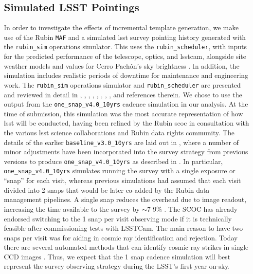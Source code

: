 \documentclass[preprintm,linenumbers]{aastex631}
\newcommand{\baselinefull}{\texttt{one\_snap\_v4.0\_10yrs}\xspace}
\newcommand{\rubinsim}{\texttt{rubin\_sim}\xspace}
\newcommand{\rubinscheduler}{\texttt{rubin\_scheduler}\xspace}
\newcommand{\maf}{\texttt{MAF}\xspace}
\begin{document}
	\subsection{Simulated LSST Pointings}
	In order to investigate the effects of incremental template generation, we make use of the Rubin \maf \citep{2014SPIE.9149E..0BJ} and a simulated \gls*{lsst} survey pointing history generated with the \rubinsim operations simulator.
 This uses the \rubinscheduler, with inputs for the predicted performance of the telescope, optics, and \gls*{lsstcam}, alongside site weather models %
 and values for Cerro Pach{\'o}n's sky brightness \citep{Yoachim2016}.
 In addition, the simulation includes realistic periods of downtime for maintenance and engineering work. 
 The \rubinsim operations simulator and \rubinscheduler are presented and reviewed in detail in \cite{2014SPIE.9150E..14C}, \cite{2014SPIE.9150E..15D}, \cite{2016SPIE.9910E..13D}, \cite{Yoachim2016},  \cite{lsstsciencecollaborationScienceDrivenOptimizationLSST2017},  \cite{2018Icar..303..181J}, \cite{2019AJ....157..151N}, \cite{jones_r_lynne_2020_4048838}, \cite{2022ApJS..258....1B} and references therein.  
 We chose to use the output from the \baselinefull cadence simulation \citep{v4.0sims,SCOC_Report_3} in our analysis. At the time of submission, this simulation was the most accurate representation of how \gls*{lsst} will be conducted, having been refined by the Rubin \gls*{scoc} in consultation with the various \gls*{lsst} science collaborations and Rubin data rights community. 
	The details of the earlier \texttt{baseline\_v3.0\_10yrs} are laid out in \cite{SCOC_Report_2}, where a number of minor adjustments have been incorporated into the survey strategy from previous versions to produce \baselinefull as described in \cite{SCOC_Report_3}. 
    In particular, \baselinefull simulates running the survey with a single exposure or 
    ``snap'' for each visit, whereas previous simulations had assumed that each visit divided into 2  snaps that would be later co-added by the Rubin data management pipelines.
    A single snap reduces the overhead due to image readout, increasing the time available to the survey by $\sim$7-9$\%$ \citep[see Section 3.6 of][]{SCOC_Report_3}. The SCOC has already endorsed switching to the 1 snap per visit observing mode if it is technically feasible after commissioning tests with LSSTCam. The main reason to have two snaps per visit was for aiding in cosmic ray identification and rejection. Today there are several automated methods that can identify cosmic ray strikes in single CCD images \citep[e.g.][]{2000PASP..112..703R, 2001PASP..113.1420V, 2005AN....326..428S, 2018zndo...1482019M}. Thus, we expect that the 1 snap cadence simulation will best represent the survey observing strategy during the LSST's first year on-sky.  
    
\end{document}
